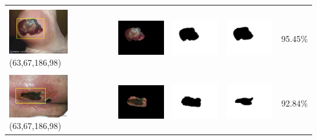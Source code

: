\begin{table}[H]
\begin{tabular}{|m{1.0in}|m{1.0in}|m{1.0in}|m{1.0in}|m{0.6in}|}
		&  &  & \\
		\includegraphics[width=1.0in]{gambar/hasil_segmentasi/luka_hitam/image_37_rect.jpg} {\centering\fontsize{10}{10}\selectfont(63,67,186,98)}&
		\includegraphics[width=1.0in]{gambar/hasil_segmentasi/luka_hitam/result_37.jpg}&
		\includegraphics[width=1.0in]{gambar/hasil_segmentasi/luka_hitam/mask_r_37.jpg}&
		\includegraphics[width=1.0in]{gambar/hasil_segmentasi/luka_hitam/37_r.jpg}&
		95.45\% \\
		\hline 

		&  &  & \\
		\includegraphics[width=1.0in]{gambar/hasil_segmentasi/luka_hitam/image_40_rect.jpg} {\centering\fontsize{10}{10}\selectfont(63,67,186,98)}&
		\includegraphics[width=1.0in]{gambar/hasil_segmentasi/luka_hitam/result_40.jpg}&
		\includegraphics[width=1.0in]{gambar/hasil_segmentasi/luka_hitam/mask_r_40.jpg}&
		\includegraphics[width=1.0in]{gambar/hasil_segmentasi/luka_hitam/40_r.jpg}&
		92.84\% \\
		\hline 


\end{tabular}
\end{table}
